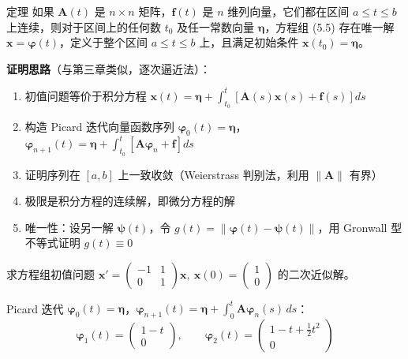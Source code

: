 \begin{myTheorem}{定理}
如果 $\mathbf{A}(t)$ 是 $n\times n$ 矩阵，$\mathbf{f}(t)$ 是 $n$ 维列向量，它们都在区间 $a \le t \le b$ 上连续，则对于区间上的任何数 $t_0$ 及任一常数向量 $\boldsymbol{\eta}$，方程组 (5.5) 存在唯一解 $\mathbf{x} = \boldsymbol{\varphi}(t)$，定义于整个区间 $a \le t \le b$ 上，且满足初始条件 $\mathbf{x}(t_0) = \boldsymbol{\eta}$。
\end{myTheorem}

\textbf{证明思路}（与第三章类似，逐次逼近法）：
\begin{enumerate}
    \item 初值问题等价于积分方程 $\mathbf{x}(t) = \boldsymbol{\eta} + \int_{t_0}^{t}[\mathbf{A}(s)\mathbf{x}(s) + \mathbf{f}(s)]ds$
    \item 构造 Picard 迭代向量函数序列 $\boldsymbol{\varphi}_0(t) = \boldsymbol{\eta}$，$\boldsymbol{\varphi}_{n+1}(t) = \boldsymbol{\eta} + \int_{t_0}^t[\mathbf{A}\boldsymbol{\varphi}_n + \mathbf{f}]ds$
    \item 证明序列在 $[a,b]$ 上一致收敛（Weierstrass 判别法，利用 $\|\mathbf{A}\|$ 有界）
    \item 极限是积分方程的连续解，即微分方程的解
    \item 唯一性：设另一解 $\boldsymbol{\psi}(t)$，令 $g(t) = \|\boldsymbol{\varphi}(t) - \boldsymbol{\psi}(t)\|$，用 Gronwall 型不等式证明 $g(t) \equiv 0$
\end{enumerate}

\begin{example}
求方程组初值问题 $\mathbf{x}' = \begin{pmatrix} -1 & 1 \\ 0 & 1 \end{pmatrix}\mathbf{x}, \ \mathbf{x}(0) = \begin{pmatrix} 1 \\ 0 \end{pmatrix}$ 的二次近似解。
\end{example}

\begin{solution}
Picard 迭代 $\boldsymbol{\varphi}_0(t) = \boldsymbol{\eta}$，$\boldsymbol{\varphi}_{n+1}(t) = \boldsymbol{\eta} + \int_{0}^{t}\mathbf{A}\boldsymbol{\varphi}_n(s)\,ds$：
$$\boldsymbol{\varphi}_1(t) = \begin{pmatrix} 1 - t \\ 0 \end{pmatrix}, \qquad \boldsymbol{\varphi}_2(t) = \begin{pmatrix} 1 - t + \frac{1}{2}t^2 \\ 0 \end{pmatrix}$$
\end{solution}

